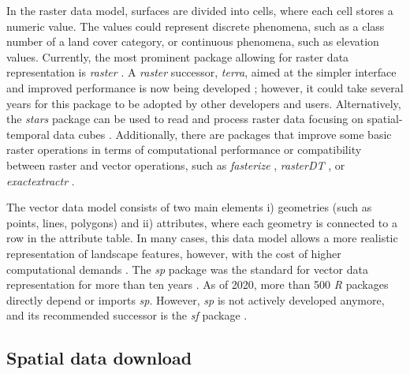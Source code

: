 \documentclass[smallextended]{svjour3}       %
\begin{document}
In the raster data model, surfaces are divided into cells, where each cell stores a numeric value.
The values could represent discrete phenomena, such as a class number of a land cover category, or continuous phenomena, such as elevation values.
Currently, the most prominent package allowing for raster data representation is \emph{raster} \cite{Hijmans2019}.
A \emph{raster} successor, \emph{terra}, aimed at the simpler interface and improved performance is now being developed \cite{R-terra}; however, it could take several years for this package to be adopted by other developers and users.
Alternatively, the \emph{stars} package can be used to read and process raster data focusing on spatial-temporal data cubes \cite{Pebesma2019}.
Additionally, there are packages that improve some basic raster operations in terms of computational performance or compatibility between raster and vector operations, such as \emph{fasterize} \cite{Ross2020}, \emph{rasterDT} \cite{OBrien2020}, or \emph{exactextractr} \cite{Baston2020}.

The vector data model consists of two main elements i) geometries (such as points, lines, polygons) and ii) attributes, where each geometry is connected to a row in the attribute table.
In many cases, this data model allows a more realistic representation of landscape features, however, with the cost of higher computational demands .
The \emph{sp} package was the standard for vector data representation for more than ten years \cite{Pebesma2005,Bivand2013}.
As of 2020, more than 500 \emph{R} packages directly depend or imports \emph{sp}.
However, \emph{sp} is not actively developed anymore, and its recommended successor is the \emph{sf} package \cite{Pebesma2018}.

\hypertarget{spatial-data-download}{%
\subsection{Spatial data download}\label{spatial-data-download}}
\end{document}
